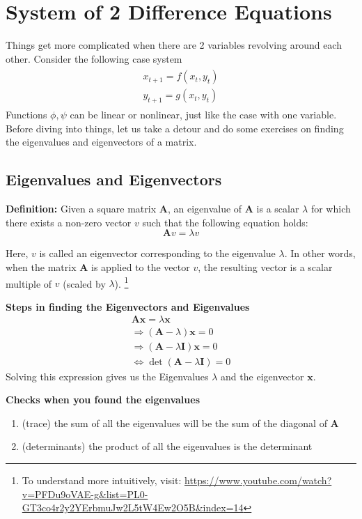 \documentclass[11pt,a4paper]{book}
\theoremstyle{definition}\newtheorem{definition}{Definition}
\theoremstyle{definition}\newtheorem{fact}{Fact}
\theoremstyle{definition}\newtheorem{remark}{Remark}
\theoremstyle{definition}\newtheorem{ex}{Ex.}
\theoremstyle{definition}\newtheorem{project}{Project}
\theoremstyle{definition}\newtheorem{problem}{Problem}
\theoremstyle{definition}\newtheorem{example}{Example}
\numberwithin{theorem}{section}
\numberwithin{corollary}{chapter}
\numberwithin{assumption}{chapter}
\numberwithin{definition}{chapter}
\numberwithin{prop}{chapter}
\numberwithin{notation}{chapter}
\numberwithin{problem}{chapter}
\numberwithin{example}{chapter}
\numberwithin{fact}{chapter}
\numberwithin{ex}{chapter}
\def\A{\mathbf A}
\def\I{\mathbf I}
\def\x{\mathbf x}
\begin{document}
	
	\section{System of 2 Difference Equations} \label{sec:sys}
	Things get more complicated when there are 2 variables revolving around each other. Consider the following case system
	\begin{align}
		\begin{matrix}
			x_{t+1} = f (x_t, y_t) \\
			y_{t+1} = g (x_t, y_t)
		\end{matrix} \label{sys_nonlin}
	\end{align}
	Functions $\phi, \psi$ can be linear or nonlinear, just like the case with one variable. Before diving into things, let us take a detour and do some exercises on finding the eigenvalues and eigenvectors of a matrix.
	
	\subsection{Eigenvalues and Eigenvectors}
	\textbf{Definition:}
	Given a square matrix $\A$, an eigenvalue of $\A$ is a scalar $\lambda$ for which there exists a non-zero vector $v$ such that the following equation holds:
	\[ \A v = \lambda v \]
	
	Here, $v$ is called an eigenvector corresponding to the eigenvalue $\lambda$. In other words, when the matrix $\A$ is applied to the vector $v$, the resulting vector is a scalar multiple of $v$ (scaled by $\lambda$). \footnote{To understand more intuitively, visit: \url{https://www.youtube.com/watch?v=PFDu9oVAE-g&list=PL0-GT3co4r2y2YErbmuJw2L5tW4Ew2O5B&index=14} }
	
	\textbf{Steps in finding the Eigenvectors and Eigenvalues}
	\begin{align*}
		\A \x = \lambda \x                   \\
		\Rightarrow (\A - \lambda) \x = 0    \\
		\Rightarrow (\A - \lambda \I) \x = 0 \\
		\iff \det (\A - \lambda \I) = 0      
	\end{align*}
	Solving this expression gives us the Eigenvalues $\lambda$ and the eigenvector $\x$.
	
	\textbf{Checks when you found the eigenvalues}
	\begin{enumerate}
		\item (trace) the sum of all the eigenvalues will be the sum of the diagonal of $\A$
		\item (determinants) the product of all the eigenvalues is the determinant
	\end{enumerate}
	
\end{document}
